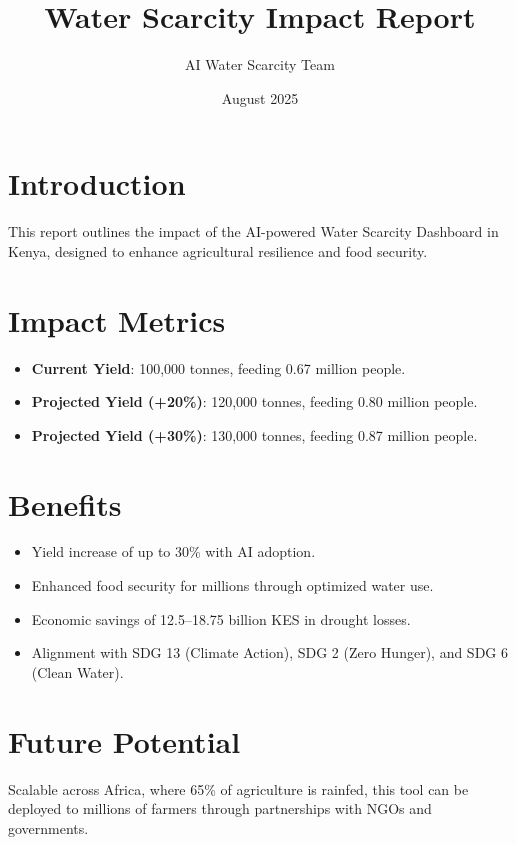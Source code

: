 \documentclass[a4paper,12pt]{article}
\title{Water Scarcity Impact Report}
\author{AI Water Scarcity Team}
\date{August 2025}
\begin{document}
\maketitle

\section{Introduction}
This report outlines the impact of the AI-powered Water Scarcity Dashboard in Kenya, designed to enhance agricultural resilience and food security.

\section{Impact Metrics}
\begin{itemize}
    \item \textbf{Current Yield}: 100,000 tonnes, feeding 0.67 million people.
    \item \textbf{Projected Yield (+20\%)}: 120,000 tonnes, feeding 0.80 million people.
    \item \textbf{Projected Yield (+30\%)}: 130,000 tonnes, feeding 0.87 million people.
\end{itemize}

\section{Benefits}
\begin{itemize}
    \item Yield increase of up to 30\% with AI adoption.
    \item Enhanced food security for millions through optimized water use.
    \item Economic savings of 12.5–18.75 billion KES in drought losses.
    \item Alignment with SDG 13 (Climate Action), SDG 2 (Zero Hunger), and SDG 6 (Clean Water).
\end{itemize}

\section{Future Potential}
Scalable across Africa, where 65\% of agriculture is rainfed, this tool can be deployed to millions of farmers through partnerships with NGOs and governments.
\end{document}
